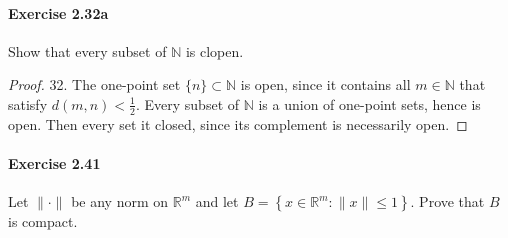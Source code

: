 \documentclass{article}
\begin{document}
\paragraph{Exercise 2.32a} Show that every subset of $\mathbb{N}$ is clopen.
\begin{proof}
    32. The one-point set $\{n\} \subset \mathbb{N}$ is open, since it contains all $m \in \mathbb{N}$ that satisfy $d(m, n)<\frac{1}{2}$. Every subset of $\mathbb{N}$ is a union of one-point sets, hence is open. Then every set it closed, since its complement is necessarily open.
\end{proof}



\paragraph{Exercise 2.41} Let $\|\cdot\|$ be any norm on $\mathbb{R}^{m}$ and let $B=\left\{x \in \mathbb{R}^{m}:\|x\| \leq 1\right\}$. Prove that $B$ is compact.
\end{document}
